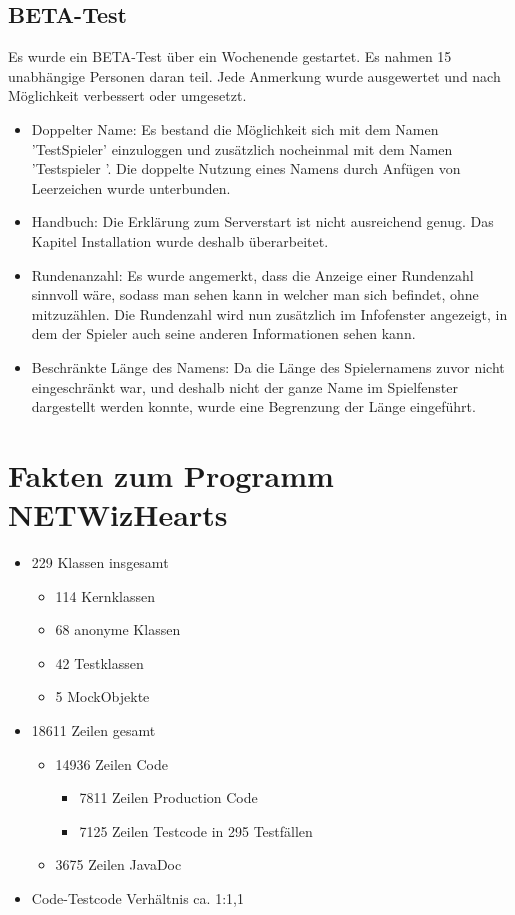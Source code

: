 \documentclass[a4paper]{article}
\begin{document}
	\subsection{BETA-Test}
	Es wurde ein BETA-Test über ein Wochenende gestartet. Es nahmen 15 unabhängige Personen daran teil.
	Jede Anmerkung wurde ausgewertet und nach Möglichkeit verbessert oder umgesetzt.
	\begin{itemize}
	\item Doppelter Name: Es bestand die Möglichkeit sich mit dem Namen 'TestSpieler' einzuloggen und zusätzlich nocheinmal 		mit dem Namen 'Testspieler '. Die doppelte Nutzung eines Namens durch Anfügen von Leerzeichen wurde unterbunden.
	\item Handbuch: Die Erklärung zum Serverstart ist nicht ausreichend genug. Das Kapitel Installation wurde deshalb 			überarbeitet.
	\item Rundenanzahl: Es wurde angemerkt, dass die Anzeige einer Rundenzahl sinnvoll wäre, sodass man sehen kann in 			welcher man sich befindet, ohne mitzuzählen. Die Rundenzahl wird nun zusätzlich im Infofenster angezeigt, in dem der			Spieler auch seine anderen Informationen sehen kann.
	\item Beschränkte Länge des Namens: Da die Länge des Spielernamens zuvor nicht eingeschränkt war, und deshalb nicht 		der ganze Name im Spielfenster dargestellt werden konnte, wurde eine Begrenzung der Länge eingeführt.
	\end{itemize}
	
\section{Fakten zum Programm NETWizHearts}
	\begin{itemize}
\item 229 Klassen insgesamt
\begin{itemize}
\item 114 Kernklassen
\item 68 anonyme Klassen
\item 42 Testklassen
\item 5 MockObjekte
\end{itemize}
\item 18611 Zeilen gesamt
\begin{itemize}
\item 14936 Zeilen Code
\begin{itemize}
\item 7811 Zeilen Production Code
\item 7125 Zeilen Testcode in 295 Testfällen
\end{itemize}
\item 3675 Zeilen JavaDoc
\end{itemize}

\item Code-Testcode Verhältnis ca. 1:1,1 
\end{itemize}
\end{document}
